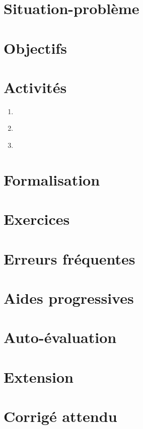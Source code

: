 \documentclass[a4paper,11pt]{article}
\begin{document}
\section*{Situation-problème}
\section*{Objectifs}
\section*{Activités}
\begin{enumerate}[nosep]
  \item ~
  \item ~
  \item ~
\end{enumerate}
\section*{Formalisation}
\section*{Exercices}
\section*{Erreurs fréquentes}
\section*{Aides progressives}
\section*{Auto-évaluation}
\section*{Extension}
\section*{Corrigé attendu}
\end{document}

